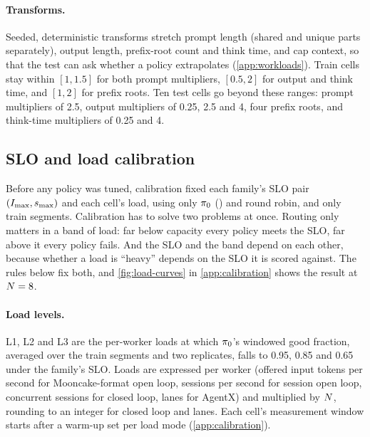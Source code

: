 \paragraph{Transforms.}
\label{sec:transforms}
Seeded, deterministic transforms stretch prompt length (shared and unique parts separately), output
length, prefix-root count and think time, and cap context, so that the test can ask whether a
policy extrapolates (\cref{app:workloads}).
Train cells stay within $[1, 1.5]$ for both prompt multipliers, $[0.5, 2]$ for output and think
time, and $[1, 2]$ for prefix roots. Ten test cells go beyond these ranges: prompt multipliers of
2.5, output multipliers of 0.25, 2.5 and 4, four prefix roots, and think-time multipliers of
0.25 and 4.

\subsection{SLO and load calibration}
\label{sec:calibration}

Before any policy was tuned, calibration fixed each family's SLO pair $(I_{\max},s_{\max})$ and each
cell's load, using only $\pi_{0}$ () and round robin, and only train segments.
Calibration has to solve two problems at once. Routing only matters in a band of load: far
below capacity every policy meets the SLO, far above it every policy fails. And the SLO and the
band depend on each other, because whether a load is ``heavy'' depends on the SLO it is scored
against. The rules below fix both, and \cref{fig:load-curves} in \cref{app:calibration} shows the
result at $N = 8$.

\paragraph{Load levels.}
L1, L2 and L3 are the per-worker loads at which $\pi_{0}$'s windowed good fraction, averaged over
the train segments and two replicates, falls to 0.95, 0.85 and 0.65 under the family's SLO. Loads
are expressed per worker (offered input tokens per second for Mooncake-format open loop, sessions
per second for session open loop, concurrent sessions for closed loop, lanes for AgentX) and
multiplied by $N$, rounding to an integer for closed loop and lanes. Each cell's measurement
window starts after a warm-up set per load mode (\cref{app:calibration}).

